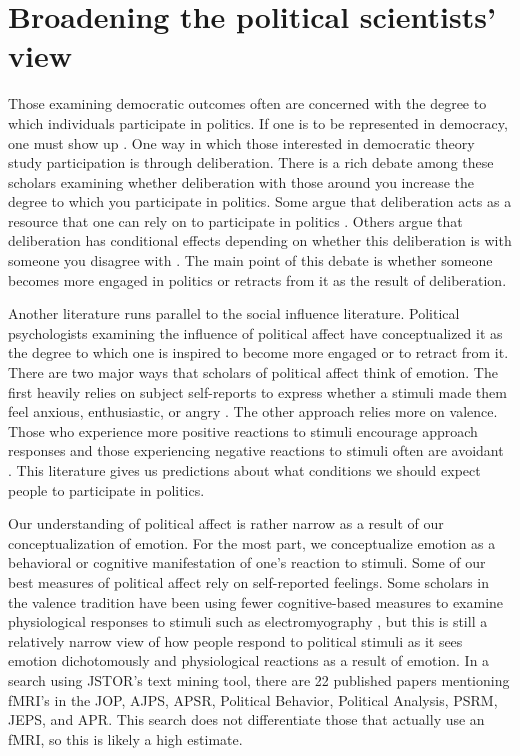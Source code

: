 \documentclass[12pt]{article}
\begin{document}

\doublespacing
\section{Broadening the political scientists' view}

Those examining democratic outcomes often are concerned with the degree to which individuals participate in politics. If one is to be represented in democracy, one must show up \citep[see][]{griffin_newman_2005}. One way in which those interested in democratic theory study participation is through deliberation. There is a rich debate among these scholars examining whether deliberation with those around you increase the degree to which you participate in politics. Some argue that deliberation acts as a resource that one can rely on to participate in politics \citep{verba_et-al_1995}. Others argue that deliberation has conditional effects depending on whether this deliberation is with someone you disagree with \citep[see][]{mutz_2002}. The main point of this debate is whether someone becomes more engaged in politics or retracts from it as the result of deliberation. 

Another literature runs parallel to the social influence literature. Political psychologists examining the influence of political affect have conceptualized it as the degree to which one is inspired to become more engaged or to retract from it. There are two major ways that scholars of political affect think of emotion. The first heavily relies on subject self-reports to express whether a stimuli made them feel anxious, enthusiastic, or angry \citep{marcus_et-al_2006}. The other approach relies more on valence. Those who experience more positive reactions to stimuli encourage approach responses and those experiencing negative reactions to stimuli often are avoidant \citep[see][]{brader_marcus_2013}. This literature gives us predictions about what conditions we should expect people to participate in politics.

Our understanding of political affect is rather narrow as a result of our conceptualization of emotion. For the most part, we conceptualize emotion as a behavioral or cognitive manifestation of one's reaction to stimuli. Some of our best measures of political affect rely on self-reported feelings. Some scholars in the valence tradition have been using fewer cognitive-based measures to examine physiological responses to stimuli such as electromyography \citep{bakker_et-al_2020}, but this is still a relatively narrow view of how people respond to political stimuli as it sees emotion dichotomously and physiological reactions as a result of emotion. In a search using JSTOR's text mining tool, there are 22 published papers mentioning fMRI's in the JOP, AJPS, APSR, Political Behavior, Political Analysis, PSRM, JEPS, and APR. This search does not differentiate those that actually use an fMRI, so this is likely a high estimate.
\end{document}
